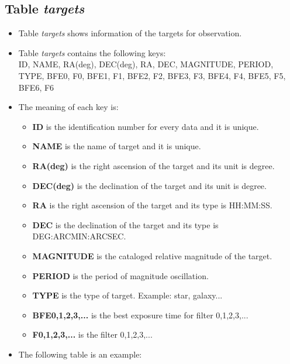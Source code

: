 \documentclass[12pt]{article}    %
\begin{document}
 \subsection{Table {\it targets}}
 \begin{itemize}
  \item Table {\it targets} shows information of the targets for observation.
  \item Table {\it targets} contains the following keys:\\
  \footnotesize   %
  \indent ID, NAME, RA(deg), DEC(deg), RA, DEC, MAGNITUDE, PERIOD, TYPE, BFE0, F0, BFE1, F1, BFE2, F2, BFE3, F3, BFE4, F4, BFE5, F5, BFE6, F6
  \normalsize
  \item The meaning of each key is:
  \begin{itemize}
   \item \textbf {ID} is the identification number for every data and it is unique.
   \item \textbf {NAME} is the name of target and it is unique.
   \item \textbf {RA(deg)} is the right ascension of the target and its unit is degree.
   \item \textbf {DEC(deg)} is the declination of the target and its unit is degree.
   \item \textbf {RA} is the right ascension of the target and its type is HH:MM:SS.
   \item \textbf {DEC} is the declination of the target and its type is DEG:ARCMIN:ARCSEC. 
   \item \textbf {MAGNITUDE} is the cataloged relative magnitude of the target.
   \item \textbf {PERIOD} is the period of magnitude oscillation. 
   \item \textbf {TYPE} is the type of target. Example: star, galaxy...
   \item \textbf {BFE0,1,2,3,...} is the best exposure time for filter 0,1,2,3,...
   \item \textbf {F0,1,2,3,...} is the filter 0,1,2,3,...
  \end{itemize}
  
	
  \item The following table is an example:
  \begin{table}[!htbp]
   \centering
   \caption{Example for table {\it targets}}
  \end{table}
 \end{itemize}
\end{document}
